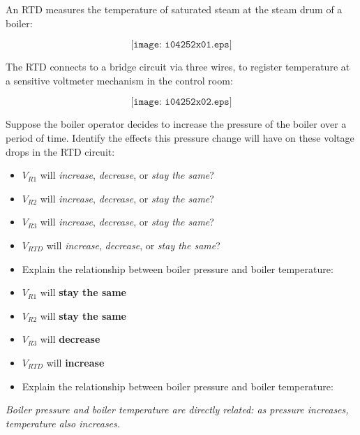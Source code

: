 

An RTD measures the temperature of saturated steam at the steam drum of a boiler:

$$\texttt{[image: i04252x01.eps]}$$

The RTD connects to a bridge circuit via three wires, to register temperature at a sensitive voltmeter mechanism in the control room:

$$\texttt{[image: i04252x02.eps]}$$

Suppose the boiler operator decides to increase the pressure of the boiler over a period of time.  Identify the effects this pressure change will have on these voltage drops in the RTD circuit:

\begin{itemize}
\item{} $V_{R1}$ will {\it increase}, {\it decrease}, or {\it stay the same}?
\item{} $V_{R2}$ will {\it increase}, {\it decrease}, or {\it stay the same}?
\item{} $V_{R3}$ will {\it increase}, {\it decrease}, or {\it stay the same}?
\item{} $V_{RTD}$ will {\it increase}, {\it decrease}, or {\it stay the same}?
\item{} Explain the relationship between boiler pressure and boiler temperature:
\end{itemize}







\begin{itemize}
\item{} $V_{R1}$ will {\bf stay the same}
\item{} $V_{R2}$ will {\bf stay the same}
\item{} $V_{R3}$ will {\bf decrease}
\item{} $V_{RTD}$ will {\bf increase}
\item{} Explain the relationship between boiler pressure and boiler temperature:
\end{itemize}
{\it Boiler pressure and boiler temperature are directly related: as pressure increases, temperature also increases.}

